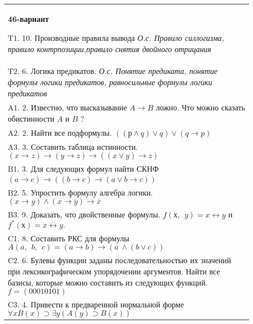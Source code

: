 \documentclass{article}
\begin{document}
\begin{tabular}{m{17cm}}
\textbf{46-вариант}
\newline

T1. 10. Производные правила вывода \emph{О.с. Правило силлогизма, правило контрпозиции,правило снятия двойного отрицания} \\
T2. 6. Логика предикатов. \emph{О.с. Понятие предиката, понятие формулы логики предикатов, равносильные формулы логики предикатов} \\
A1. 2. Известно, что высказывание \(A \rightarrow B\) ложно. Что можно сказать обистинности \(A\) и \(B\) ? \\
A2. 2. Найти все подформулы. \(\left( (р \land q) \vee q \right) \vee (q \rightarrow p)\) \\
A3. 3. Составить таблица истинности. \((x \rightarrow z) \rightarrow (y \rightarrow z) \rightarrow ((x \vee y) \rightarrow z)\) \\
B1. 3. Для следующих формул найти СКНФ \(\overline{(a \rightarrow c)} \rightarrow \left( (b \rightarrow c) \rightarrow (a \vee b \rightarrow c) \right)\) \\
B2. 5. Упростить формулу алгебра логики. \((x \rightarrow y) \land (x \rightarrow \overline{y}) \rightarrow \overline{x}\) \\
B3. 9. Доказать, что двойственные формулы. \(f(х,\ \ y) = x \leftrightarrow y\) и \(f^{*}(х) = \overline{x \leftrightarrow y}.\) \\
C1. 8. Составить РКС для формулы \(A(a,\ \ b,\ \ c) = (a \rightarrow b) \rightarrow (\overline{a}\  \land (b \vee c))\) \\
C2. 6. Булевы функции заданы последовательностью их значений при лексикографическом упорядочении аргументов. Найти все базисы, которые можно составить из следующих функций. \(f = (00010101)\) \\
C3. 4. Привести к предваренной нормальной форме \(\forall xB(x) \supset \exists y(A(y) \supset B(x))\) \\

\end{tabular}
\vspace{1cm}
\end{document}
